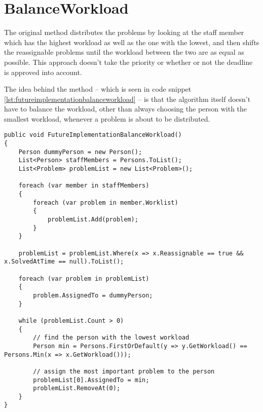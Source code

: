 \section{BalanceWorkload}
\label{sec:futureimplementationbalanceworkload}

The original  method distributes the problems by looking at the staff member which has the highest workload as well as the one with the lowest, and then shifts the reassignable problems until the workload between the two are as equal as possible. This approach doesn't take the priority or whether or not the deadline is approved into account.

The idea behind the  method -- which is seen in code snippet \ref{lst:futureimplementationbalanceworkload} -- is that the algorithm itself doesn't have to balance the workload, other than always choosing the person with the smallest workload, whenever a problem is about to be distributed. 

\begin{lstlisting}[style=sourceCode, caption=\myCaption{A possible future implementation of the \me{BalanceWorkload} algorithm.}, label=lst:futureimplementationbalanceworkload]
public void FutureImplementationBalanceWorkload()
{
    Person dummyPerson = new Person();
    List<Person> staffMembers = Persons.ToList();
    List<Problem> problemList = new List<Problem>();

    foreach (var member in staffMembers)
    {
        foreach (var problem in member.Worklist)
        {
            problemList.Add(problem);
        }
    }

    problemList = problemList.Where(x => x.Reassignable == true && x.SolvedAtTime == null).ToList();

    foreach (var problem in problemList)
    {
        problem.AssignedTo = dummyPerson;
    }

    while (problemList.Count > 0)
    {
        // find the person with the lowest workload
        Person min = Persons.FirstOrDefault(y => y.GetWorkload() == Persons.Min(x => x.GetWorkload()));

        // assign the most important problem to the person
        problemList[0].AssignedTo = min;
        problemList.RemoveAt(0);
    }
}
\end{lstlisting}
